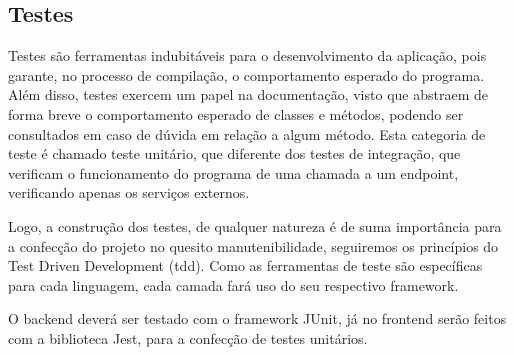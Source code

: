 
\subsection{Testes}
Testes são ferramentas indubitáveis para o desenvolvimento da aplicação, pois garante, no processo de compilação, o comportamento esperado do programa. Além disso, testes exercem um papel na documentação, visto que abstraem de forma breve o comportamento esperado de classes e métodos,
podendo ser consultados em caso de dúvida em relação a algum método. Esta categoria de teste é chamado teste unitário, que diferente dos testes de integração, que verificam o funcionamento do programa de uma chamada a um \gls{endpoint}, verificando apenas os serviços externos.

Logo, a construção dos testes, de qualquer natureza é de suma importância para a confecção do projeto no quesito manutenibilidade, seguiremos os princípios do Test Driven Development (\gls{tdd}). Como as ferramentas de teste são específicas para cada linguagem, cada camada fará uso do seu respectivo \gls{framework}.

O \gls{backend} deverá ser testado com o \gls{framework} JUnit, já no \gls{frontend} serão feitos com a biblioteca Jest, para a confecção de testes unitários.